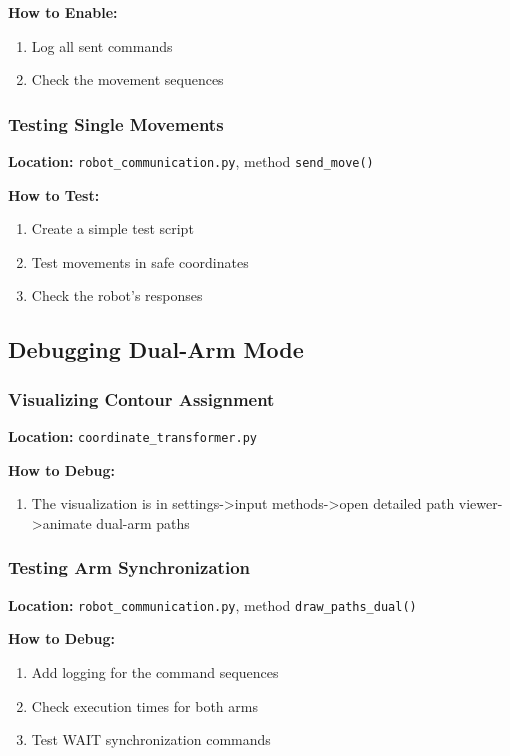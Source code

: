 \documentclass[a4paper,12pt]{article}
\begin{document}
\textbf{How to Enable:}
\begin{enumerate}
\item Log all sent commands
\item Check the movement sequences
\end{enumerate}

\subsubsection{Testing Single Movements}
\textbf{Location:} \texttt{robot\_communication.py}, method \texttt{send\_move()}

\textbf{How to Test:}
\begin{enumerate}
\item Create a simple test script
\item Test movements in safe coordinates
\item Check the robot's responses
\end{enumerate}

\subsection{Debugging Dual-Arm Mode}

\subsubsection{Visualizing Contour Assignment}
\textbf{Location:} \texttt{coordinate\_transformer.py}

\textbf{How to Debug:}
\begin{enumerate}
\item The visualization is in settings->input methods->open detailed path viewer->animate dual-arm paths
\end{enumerate}

\subsubsection{Testing Arm Synchronization}
\textbf{Location:} \texttt{robot\_communication.py}, method \texttt{draw\_paths\_dual()}

\textbf{How to Debug:}
\begin{enumerate}
\item Add logging for the command sequences
\item Check execution times for both arms
\item Test WAIT synchronization commands
\end{enumerate}
\end{document}
